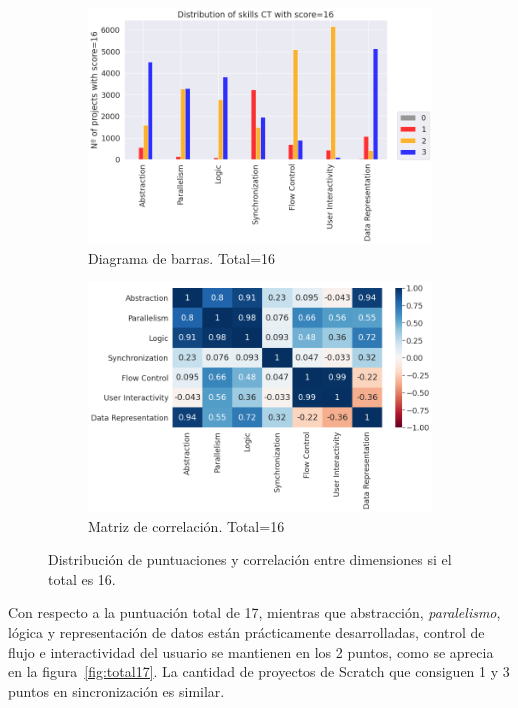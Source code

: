 \documentclass[a4paper, 12pt]{book}
\begin{document}
\begin{figure}
    \centering
    \begin{subfigure}[h]{.49\textwidth} 
        \includegraphics[width=\textwidth]{img/distribucion_16_Scratch}
        \caption{Diagrama de barras. Total=16}
        \label{fig:total16}
    \end{subfigure}       
    \begin{subfigure}[h]{.49\textwidth} 
        \includegraphics[width=\textwidth]{img/corr_16_Scratch}
        \caption{Matriz de correlación. Total=16}
        \label{fig:corr16}
    \end{subfigure}
     \caption{Distribución de puntuaciones y correlación entre dimensiones si el total es 16.}
\end{figure}

Con respecto a la puntuación total de 17, mientras que abstracción, \emph{paralelismo}, lógica y representación de datos están prácticamente desarrolladas, control de flujo e interactividad del usuario se mantienen en los 2 puntos, como se aprecia en la figura~\ref{fig:total17}. La cantidad de proyectos de Scratch que consiguen 1 y 3 puntos en sincronización es similar.
\end{document}
